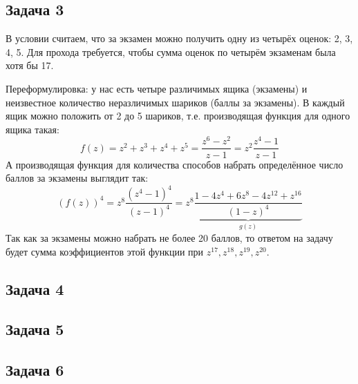\subsection{Задача 3}
	\begin{Rem}
		В условии считаем, что за экзамен можно получить одну из четырёх оценок: 2, 3, 4, 5.
		Для прохода требуется, чтобы сумма оценок по четырём экзаменам была хотя бы 17.
	\end{Rem}
	Переформулировка: у нас есть четыре различимых ящика (экзамены) и неизвестное количество неразличимых шариков (баллы за экзамены).
	В каждый ящик можно положить от 2 до 5 шариков, т.е. производящая функция для одного ящика такая:
	\[ f(z) = z^2 + z^3 + z^4 + z^5 = \frac{z^6-z^2}{z-1} = z^2\frac{z^4-1}{z-1} \]
	А производящая функция для количества способов набрать определённое число баллов за экзамены выглядит так:
	\[
		(f(z))^4 = z^{8}\frac{(z^4-1)^4}{(z-1)^4} = z^8\underbrace{\frac{1-4z^4+6z^8-4z^{12}+z^{16}}{(1-z)^4}}_{g(z)}
	\]
	Так как за экзамены можно набрать не более 20 баллов, то ответом на задачу будет сумма коэффициентов этой функции при $z^{17}, z^{18}, z^{19}, z^{20}$.
	\TODO

\subsection{Задача 4}
	\TODO

\subsection{Задача 5}
	\TODO

\subsection{Задача 6}
	\TODO
